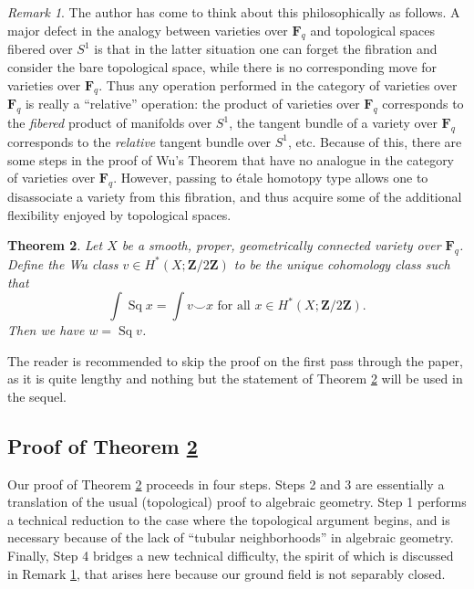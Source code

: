 \documentclass[10pt, reqno]{amsart}
\numberwithin{equation}{subsection}
\newcommand{\F}{\mathbf{F}}
\newcommand{\Z}{\mathbf{Z}}
\DeclareMathOperator{\et}{\acute{e}t}
\DeclareMathOperator{\Sq}{Sq}
\newtheorem{thm}{Theorem}[section]
\theoremstyle{remark}
\newtheorem{remark}[thm]{Remark}
\begin{document}
\begin{remark}\label{rem: philosophy} The author has come to think about this philosophically as follows. A major defect in the analogy between varieties over $\F_q$ and topological spaces fibered over $S^1$ is that in the latter situation one can forget the fibration and consider the bare topological space, while there is no corresponding move for varieties over $\F_q$. Thus any operation performed in the category of varieties over $\F_q$ is really a ``relative'' operation: the product of varieties over $\F_q$ corresponds to the \emph{fibered} product of manifolds over $S^1$, the tangent bundle of a variety over $\F_q$ corresponds to the \emph{relative} tangent bundle over $S^1$, etc. Because of this, there are some steps in the proof of Wu's Theorem that have no analogue in the category of varieties over $\F_q$. However, passing to \'{e}tale homotopy type allows one to disassociate a variety from this fibration, and thus acquire some of the additional flexibility enjoyed by topological spaces. 
\end{remark} 

\begin{thm}\label{Wu theorem finite field} Let $X$ be a smooth, proper, geometrically connected variety over $\F_q$. Define the Wu class $v \in H^*_{\et}(X; \Z/2\Z)$ to be the unique cohomology class such that 
\[
\int \Sq x = \int v \smile x \text{  for all $x \in H^*_{\et}(X; \Z/2\Z)$}.
\]
 Then we have $w = \Sq v$.
\end{thm}


The reader is recommended to skip the proof on the first pass through the paper, as it is quite lengthy and nothing but the statement of Theorem \ref{Wu theorem finite field} will be used in the sequel. 


\subsection{Proof of Theorem \ref{Wu theorem finite field}}\label{WuProof}

Our proof of Theorem \ref{Wu theorem finite field} proceeds in four steps. Steps 2 and 3 are essentially a translation of the usual (topological) proof to algebraic geometry. Step 1 performs a technical reduction to the case where the topological argument begins, and is necessary because of the lack of ``tubular neighborhoods'' in algebraic geometry. Finally, Step 4 bridges a new technical difficulty, the spirit of which is discussed in Remark \ref{rem: philosophy}, that arises here because our ground field is not separably closed.
\end{document}
